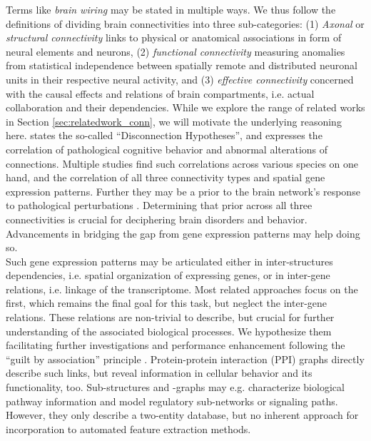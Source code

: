 \documentclass[]{article}
\renewcommand{\cite}{\citep}
\begin{document}
Terms like \textit{brain wiring} may be stated in multiple ways. We thus follow the definitions of \citet{sporns2016networks} dividing brain connectivities into three sub-categories: (1) \textit{Axonal} or \textit{structural connectivity} links to physical or anatomical associations in form of neural elements and neurons, (2) \textit{functional connectivity} measuring anomalies from statistical independence between spatially remote and distributed neuronal units in their respective neural activity, and (3) \textit{effective connectivity} concerned with the causal effects and relations of brain compartments, i.e. actual collaboration and their dependencies. While we explore the range of related works in Section \ref{sec:relatedwork_conn}, we will motivate the underlying reasoning here. \citet{friston2002dysfunctional} states the so-called ``Disconnection Hypotheses'', and expresses the correlation of pathological cognitive behavior and abnormal alterations of connections. Multiple studies find such correlations across various species on one hand, and the correlation of all three connectivity types and spatial gene expression patterns. Further they may be a prior to the brain network's response to pathological perturbations \cite{fornito2015connectomics}. Determining that prior across all three connectivities is crucial for deciphering brain disorders and behavior. Advancements in bridging the gap from gene expression patterns may help doing so.\\

Such gene expression patterns may be articulated either in inter-structures dependencies, i.e. spatial organization of expressing genes, or in inter-gene relations, i.e. linkage of the transcriptome. Most related approaches focus on the first, which remains the final goal for this task, but neglect the inter-gene relations. These relations are non-trivial to describe, but crucial for further understanding of the associated biological processes. We hypothesize them facilitating further investigations and performance enhancement following the ``guilt by association'' principle \cite{Oliver2000, Gillis2012}.
Protein-protein interaction (PPI) graphs directly describe such links, but reveal information in cellular behavior and its functionality, too. Sub-structures and -graphs may e.g. characterize biological pathway information and model regulatory sub-networks or signaling paths. However, they only describe a two-entity database, but no inherent approach for incorporation to automated feature extraction methods. \\
\end{document}
